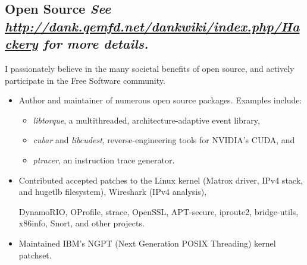 \documentclass{article}
\newenvironment{tightitemize}
{\begin{itemize}
  \setlength{\itemsep}{1pt}
  \setlength{\parskip}{0pt}
  \setlength{\parsep}{0pt}}
{\end{itemize}}
\begin{document}
\subsection*{Open Source \hfill\tiny\textit{See \href{http://dank.qemfd.net/dankwiki/index.php/Hackery}{http://dank.qemfd.net/dankwiki/index.php/Hackery} for more details.}}
I passionately believe in the many societal benefits of open source, and actively
participate in the Free Software community.
\begin{tightitemize}
\item Author and maintainer of numerous open source packages. Examples include:
\begin{tightitemize}
\item \textit{libtorque}, a multithreaded, architecture-adaptive event library,
\item \textit{cubar} and \textit{libcudest}, reverse-engineering tools for NVIDIA's CUDA, and
\item \textit{ptracer}, an instruction trace generator.
\end{tightitemize}
\item Contributed accepted patches to
the Linux kernel (Matrox driver, IPv4 stack, and hugetlb filesystem), 
Wireshark (IPv4 analysis),

{\indent} DynamoRIO, OProfile,
  strace, OpenSSL, APT-secure, iproute2, bridge-utils, x86info, Snort, and other projects.
\item Maintained IBM's NGPT (Next Generation POSIX Threading) kernel patchset.
\end{tightitemize}

\vspace{2mm}
\end{document}
